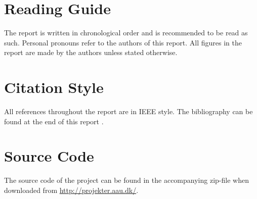 \section*{Reading Guide}
The report is written in chronological order and is recommended to be read as such. Personal pronouns refer to the authors of this report. All figures in the report are made by the authors unless stated otherwise.

\section*{Citation Style}
All references throughout the report are in IEEE style. The bibliography can be found at the end of this report .

\section*{Source Code}
The source code of the project can be found in the accompanying zip-file when downloaded from \url{http://projekter.aau.dk/}.
